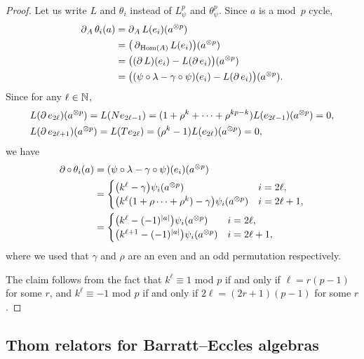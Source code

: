\begin{proof}
	Let us write $L$ and $\theta_i$ instead of $L_\psi^p$ and $\theta_\psi^p$.
	Since $a$ is a mod~$p$ cycle,
	\begin{align*}
		\operatorname{\partial}_A \theta_i(a) & =
		\operatorname{\partial}_A L(e_i)(a^{\otimes p}) \\ & =
		\big(\operatorname{\partial}_{\mathrm{Hom}(A)} L(e_i)\big)(a^{\otimes p}) \\ & =
		\big((\operatorname{\partial} L)(e_i) - L(\operatorname{\partial} e_i)\big)(a^{\otimes p}) \\ & =
		\big((\psi \mathbin{\circ} \lambda - \gamma \mathbin{\circ} \psi)(e_i) - L(\operatorname{\partial} e_i)\big) (a^{\otimes p}).
	\end{align*}
	Since for any $\ell \in \mathbb{N}$,
	\begin{align*}
		&L(\operatorname{\partial} e_{2\ell})(a^{\otimes p}) = L(N e_{2\ell-1}) = (1+\rho^k+\dots+\rho^{kp-k})L(e_{2\ell-1}) (a^{\otimes p}) = 0, \\
		&L(\operatorname{\partial} e_{2\ell+1})(a^{\otimes p}) = L(T e_{2\ell}) = (\rho^k - 1) L(e_{2\ell})(a^{\otimes p}) = 0,
	\end{align*}
	we have
	\begin{align*}
		\operatorname{\partial} \mathbin{\circ}\, \theta_i(a) & =
		(\psi \mathbin{\circ} \lambda - \gamma \mathbin{\circ} \psi)(e_i)(a^{\otimes p}) \\ & =
		\begin{cases}
			\big(k^\ell - \gamma\big) \psi_i(a^{\otimes p}) & i = 2\ell, \\
			\big(k^\ell (1+\rho\dots+\rho^k) - \gamma\big) \psi_i(a^{\otimes p}) & i = 2\ell+1,
		\end{cases}
		\\ & =
		\begin{cases}
			\big(k^\ell - (-1)^{\lvert a\rvert}\big) \psi_i(a^{\otimes p}) & i = 2\ell, \\
			\big(k^{\ell+1} - (-1)^{\lvert a\rvert}\big) \psi_i(a^{\otimes p}) & i = 2\ell+1,
		\end{cases}
	\end{align*}
	where we used that $\gamma$ and $\rho$ are an even and an odd permutation respectively.

	The claim follows from the fact that $k^\ell \equiv 1$ mod $p$ if and only if $\ell = r(p-1)$ for some $r$, and $k^\ell \equiv -1$ mod $p$ if and only if $2\ell = (2r+1)(p-1)$ for some $r$.
\end{proof}

\subsection{Thom relators for Barratt--Eccles algebras}

